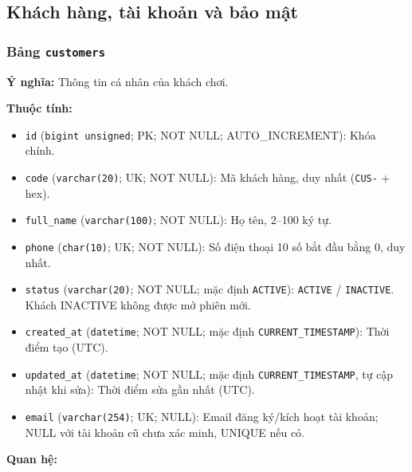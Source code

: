 \subsection{Khách hàng, tài khoản và bảo mật}

\subsubsection{Bảng \texttt{customers}}

\textbf{Ý nghĩa:} Thông tin cá nhân của khách chơi.\par

\textbf{Thuộc tính:}

\begin{itemize}

\item \texttt{id} (\texttt{bigint unsigned}; PK; NOT NULL; AUTO_INCREMENT): Khóa chính.

\item \texttt{code} (\texttt{varchar(20)}; UK; NOT NULL): Mã khách hàng, duy nhất (\texttt{CUS-} + hex).

\item \texttt{full\_name} (\texttt{varchar(100)}; NOT NULL): Họ tên, 2–100 ký tự.

\item \texttt{phone} (\texttt{char(10)}; UK; NOT NULL): Số điện thoại 10 số bắt đầu bằng 0, duy nhất.

\item \texttt{status} (\texttt{varchar(20)}; NOT NULL; mặc định \texttt{ACTIVE}): \texttt{ACTIVE} / \texttt{INACTIVE}. Khách INACTIVE không được mở phiên mới.

\item \texttt{created\_at} (\texttt{datetime}; NOT NULL; mặc định \texttt{CURRENT\_TIMESTAMP}): Thời điểm tạo (UTC).

\item \texttt{updated\_at} (\texttt{datetime}; NOT NULL; mặc định \texttt{CURRENT\_TIMESTAMP}, tự cập nhật khi sửa): Thời điểm sửa gần nhất (UTC).

\item \texttt{email} (\texttt{varchar(254)}; UK; NULL): Email đăng ký/kích hoạt tài khoản; NULL với tài khoản cũ chưa xác minh, UNIQUE nếu có.

\end{itemize}

\textbf{Quan hệ:}

